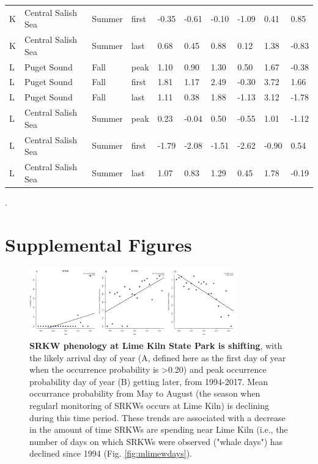 \documentclass{article}
\begin{document}
\begin{table}[ht]
\begin{tabular}{|p{}|p{}|p{}|p{}|p{}p{}p{}|p{}p{}p{}|}
  K & Central Salish Sea & Summer & first & -0.35 & -0.61 & -0.10 & -1.09 & 0.41 & 0.85 \\ 
  K & Central Salish Sea & Summer & last & 0.68 & 0.45 & 0.88 & 0.12 & 1.38 & -0.83 \\ 
   \hline
L & Puget Sound & Fall & peak & 1.10 & 0.90 & 1.30 & 0.50 & 1.67 & -0.38 \\ 
  L & Puget Sound & Fall & first & 1.81 & 1.17 & 2.49 & -0.30 & 3.72 & 1.66 \\ 
  L & Puget Sound & Fall & last & 1.11 & 0.38 & 1.88 & -1.13 & 3.12 & -1.78 \\ 
  L & Central Salish Sea & Summer & peak & 0.23 & -0.04 & 0.50 & -0.55 & 1.01 & -1.12 \\ 
  L & Central Salish Sea & Summer & first & -1.79 & -2.08 & -1.51 & -2.62 & -0.90 & 0.54 \\ 
  L & Central Salish Sea & Summer & last & 1.07 & 0.83 & 1.29 & 0.45 & 1.78 & -0.19 \\ 
   \hline
\end{tabular}
\endgroup
\end{table}. \newline


\newpage

\section* {Supplemental Figures}


\begin{figure}[p]
\includegraphics[width=0.8\textwidth]{../analyses/orcaphen/figures/phentrends_lime_peak.png} 
\caption{\textbf{SRKW phenology at Lime Kiln State Park is shifting}, with the likely arrival day of year (A, defined here as the first day of year when the occurrence probability is >0.20) and peak occurrence probability day of year (B) getting later, from 1994-2017. Mean occurrance probability from May to August (the season when regularl monitoring of SRKWs occurs at Lime Kiln) is declining during this time period. These trends are associated with a decrease in the amount of time SRKWs are spending near Lime Kiln (i.e., the number of days on which SRKWs were observed ("whale days") has declined since 1994 (Fig. \ref{fig:mlimewdays}).}
\label{fig:limetime}
\end{figure}
\newpage
\end{document}
